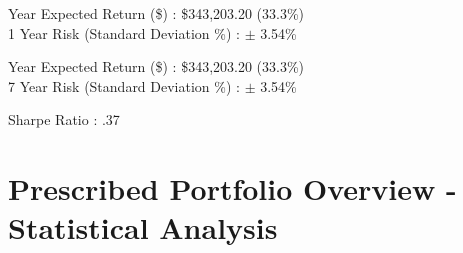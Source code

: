 \documentclass{article}
\begin{document}
 Year Expected Return (\$) : \$343,203.20 (33.3\%)\\
1 Year Risk (Standard Deviation \%) : $\pm$ 3.54\%

 Year Expected Return (\$) : \$343,203.20 (33.3\%)\\
7 Year Risk (Standard Deviation \%) : $\pm$ 3.54\%

\noindent
Sharpe Ratio : .37

\newpage    %


\section{Prescribed Portfolio Overview - Statistical Analysis}

\vspace{1.5cm}

\end{document}
